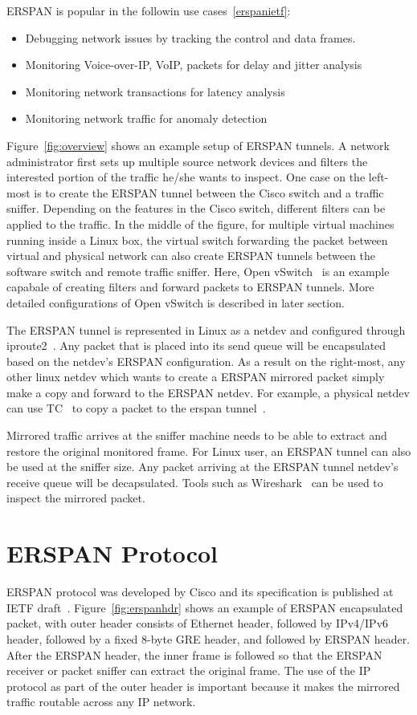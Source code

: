 \documentclass{sigplanconf}
\begin{document}
ERSPAN is popular in the followin use cases~\ref{erspanietf}:
\begin{itemize}
\item Debugging network issues by tracking the control and data frames. 
\item Monitoring Voice-over-IP, VoIP, packets for delay and jitter analysis
\item Monitoring network transactions for latency analysis
\item Monitoring network traffic for anomaly detection
\end{itemize}
Figure~\ref{fig:overview} shows an example setup of ERSPAN tunnels.
A network administrator first sets up multiple source network devices
and filters the interested portion of the traffic he/she wants
to inspect.  One case on the left-most is to create the ERSPAN tunnel
between the Cisco switch and a traffic sniffer.  Depending on the
features in the Cisco switch, different filters can be applied to the
traffic.  In the middle of the figure, for multiple virtual machines running
inside a Linux box, the virtual switch forwarding the packet between
virtual and physical network can also create ERSPAN tunnels between
the software switch and remote traffic sniffer.
Here, Open vSwitch~\cite{ovs} is an example capabale of creating filters
and forward packets to ERSPAN tunnels. More detailed configurations of
Open vSwitch is described in later section. 

The ERSPAN tunnel is represented in Linux as a netdev and configured
through iproute2~\cite{iproute2}. Any packet that is placed into its send
queue will be encapsulated based on the netdev's ERSPAN configuration.  
As a result on the right-most, any other linux netdev which wants to create
a ERSPAN mirrored packet simply make a copy and forward to the ERSPAN netdev.
For example, a physical netdev can use TC~\cite{tc} to copy a packet
to the erspan tunnel~\cite{tcselftest}.

Mirrored traffic arrives at the sniffer machine needs to be able to
extract and restore the original monitored frame.
For Linux user, an ERSPAN tunnel can also be used at the sniffer size.
Any packet arriving at the ERSPAN tunnel netdev's receive queue will
be decapsulated. Tools such as Wireshark~\cite{wireshark} can be used
to inspect the mirrored packet.

\section{ERSPAN Protocol}
ERSPAN protocol was developed by Cisco and its specification is published at IETF
draft~\cite{erspan}.  
Figure~\ref{fig:erspanhdr} shows an example of ERSPAN encapsulated
packet, with outer header consists of Ethernet header, followed by IPv4/IPv6
header, followed by a fixed 8-byte GRE header, and followed by ERSPAN header.
After the ERSPAN header, the inner frame is followed so that the ERSPAN receiver
or packet sniffer can extract the original frame.
The use of the IP protocol as part of the outer header is important because it
makes the mirrored traffic routable across any IP network.
\end{document}
